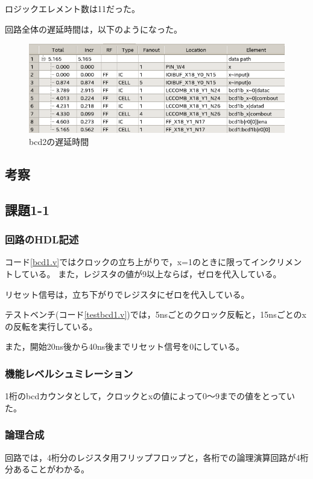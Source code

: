 ロジックエレメント数は11だった。

回路全体の遅延時間は，以下のようになった。

\begin{figure}[H]
  \centering
  \includegraphics[width=\linewidth]{./src/bcd/bcd2timing.png}
  \caption{bcd2の遅延時間}
\end{figure}

\subsection{考察}
\subsection*{課題1-1}
\subsubsection{回路のHDL記述}
コード\ref{bcd1.v}ではクロックの立ち上がりで，x=1のときに限ってインクリメントしている。
また，レジスタの値が9以上ならば，ゼロを代入している。

リセット信号は，立ち下がりでレジスタにゼロを代入している。

テストベンチ(コード\ref{testbcd1.v})では，5nsごとのクロック反転と，15nsごとのxの反転を実行している。

また，開始20ns後から40ns後までリセット信号を0にしている。

\subsubsection{機能レベルシュミレーション}
1桁のbcdカウンタとして，クロックとxの値によって0～9までの値をとっていた。

\subsubsection{論理合成}
回路では，4桁分のレジスタ用フリップフロップと，各桁での論理演算回路が4桁分あることがわかる。

